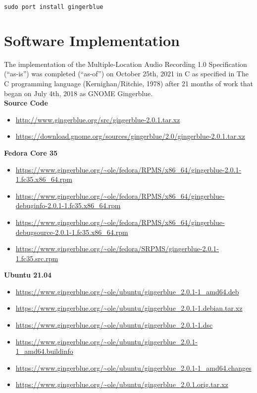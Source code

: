 \documentclass[UKenglish]{ifimaster}  %
\begin{document}
\begin{verbatim}
sudo port install gingerblue
\end{verbatim}

\chapter*{Software Implementation}

\noindent The implementation of the Multiple-Location Audio Recording
1.0 Specification (``as-is'') was completed (``as-of'') on October
25th, 2021 in C as specified in The C programming
language ({Kernighan/Ritchie, 1978}) after 21 months of work that began
on July 4th, 2018 as GNOME Gingerblue.\\

\noindent \textbf{Source Code}

\begin{itemize}
\item \url{http://www.gingerblue.org/src/gingerblue-2.0.1.tar.xz}
\item \url{https://download.gnome.org/sources/gingerblue/2.0/gingerblue-2.0.1.tar.xz}
\end{itemize}

\noindent \textbf{Fedora Core 35}

\begin{itemize}
\item \url{https://www.gingerblue.org/~ole/fedora/RPMS/x86_64/gingerblue-2.0.1-1.fc35.x86_64.rpm}
\item \url{https://www.gingerblue.org/~ole/fedora/RPMS/x86_64/gingerblue-debuginfo-2.0.1-1.fc35.x86_64.rpm}
\item \url{https://www.gingerblue.org/~ole/fedora/RPMS/x86_64/gingerblue-debugsource-2.0.1-1.fc35.x86_64.rpm}
\item \url{https://www.gingerblue.org/~ole/fedora/SRPMS/gingerblue-2.0.1-1.fc35.src.rpm}
\end{itemize}

\noindent \textbf{Ubuntu 21.04}

\begin{itemize}
\item \url{https://www.gingerblue.org/~ole/ubuntu/gingerblue_2.0.1-1_amd64.deb}
\item \url{https://www.gingerblue.org/~ole/ubuntu/gingerblue_2.0.1-1.debian.tar.xz}
\item \url{https://www.gingerblue.org/~ole/ubuntu/gingerblue_2.0.1-1.dsc}
\item \url{https://www.gingerblue.org/~ole/ubuntu/gingerblue_2.0.1-1_amd64.buildinfo}
\item \url{https://www.gingerblue.org/~ole/ubuntu/gingerblue_2.0.1-1_amd64.changes}
\item \url{https://www.gingerblue.org/~ole/ubuntu/gingerblue_2.0.1.orig.tar.xz}
\end{itemize}
\end{document}
